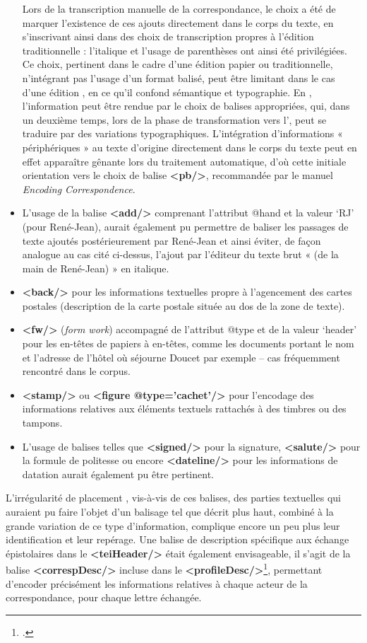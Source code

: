 \begin{itemize}[label=\textbullet]
    Lors de la transcription manuelle de la correspondance, le choix a été de marquer l’existence de ces ajouts directement dans le corps du texte, en s’inscrivant ainsi dans des choix de transcription propres à l’édition traditionnelle : l’italique et l’usage de parenthèses ont ainsi été privilégiées. Ce choix, pertinent dans le cadre d’une édition papier ou traditionnelle, n’intégrant pas l’usage d’un format balisé, peut être limitant dans le cas d’une édition \tei, en ce qu’il confond sémantique et typographie. 
    En \tei, l’information peut être rendue par le choix de balises appropriées, qui, dans un deuxième temps, lors de la phase de transformation vers l’\html, peut se traduire par des variations typographiques. L’intégration d’informations « périphériques » au texte d’origine directement dans le corps du texte peut en effet apparaître gênante lors du traitement automatique, d’où cette initiale orientation vers le choix de balise \textbf{<pb/>}, recommandée par le manuel \textit{Encoding Correspondence}. 
    \item L’usage de la balise \textbf{<add/>} comprenant l’attribut @hand et la valeur ‘RJ’ (pour René-Jean), aurait également pu permettre de baliser les passages de texte ajoutés postérieurement par René-Jean et ainsi éviter, de façon analogue au cas cité ci-dessus, l’ajout par l’éditeur du texte brut « (de la main de René-Jean) » en italique. 
    \item \textbf{<back/>} pour les informations textuelles propre à l’agencement des cartes postales (description de la carte postale située au dos de la zone de texte).
    \item \textbf{<fw/>} (\textit{form work}) accompagné de l’attribut @type et de la valeur ‘header’ pour les en-têtes de papiers à en-têtes, comme les documents portant le nom et l’adresse de l’hôtel où séjourne Doucet par exemple – cas fréquemment rencontré dans le corpus.
    \item \textbf{<stamp/>} ou \textbf{<figure @type=’cachet’/>} pour l’encodage des informations relatives aux éléments textuels rattachés à des timbres ou des tampons.
    \item L’usage de balises telles que \textbf{<signed/>} pour la signature, \textbf{<salute/>} pour la formule de politesse ou encore \textbf{<dateline/>} pour les informations de datation aurait également pu être pertinent. 
\end{itemize}

L’irrégularité de placement , vis-à-vis de ces balises, des parties textuelles qui auraient pu faire l’objet d’un balisage tel que décrit plus haut, combiné à la grande variation de ce type d’information, complique encore un peu plus leur identification et leur repérage. 
Une balise de description spécifique aux échange épistolaires dans le \textbf{<teiHeader/>} était également envisageable, il s’agit de la balise \textbf{<correspDesc/>} incluse dans le \textbf{<profileDesc/>}\footcite{tei_consortium_tei_2024}, permettant d’encoder précisément les informations relatives à chaque acteur de la correspondance, pour chaque lettre échangée.

